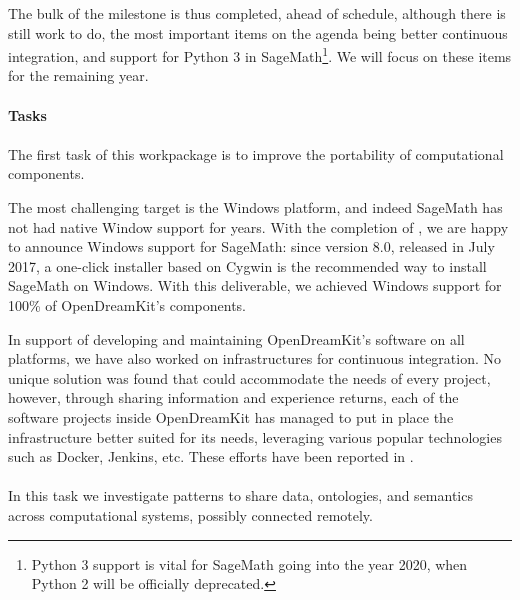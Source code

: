   The bulk of the milestone is thus completed, ahead of schedule,
  although there is still work to do, the most important items on the
  agenda being better continuous integration, and support for Python 3
  in SageMath\footnote{Python 3 support is vital for SageMath going
    into the year 2020, when Python 2 will be officially
    deprecated.}. We will focus on these items for the remaining year.
  
\paragraph{Tasks}

  \paragraph{}
  \label{component-architecture@portability}
  The first task of this workpackage is to improve the portability of
  computational components.

  The most challenging target is the Windows platform, and indeed
  SageMath has not had native Window support for years. With the
  completion of
  , we are
  happy to announce Windows support for SageMath: since version 8.0,
  released in July 2017, a one-click installer based on Cygwin is the
  recommended way to install SageMath on Windows. With this
  deliverable, we achieved Windows support for 100\% of OpenDreamKit's
  components.

  In support of developing and maintaining OpenDreamKit's software on
  all platforms, we have also worked on infrastructures for continuous
  integration. No unique solution was found that could accommodate the
  needs of every project, however, through sharing information and
  experience returns, each of the software projects inside
  OpenDreamKit has managed to put in place the infrastructure better
  suited for its needs, leveraging various popular technologies such
  as Docker, Jenkins, etc. These efforts have been reported in
  .

  \paragraph{}
  \label{component-architecture@interface-systems}
  In this task we investigate patterns to share data, ontologies,
  and semantics across computational systems, possibly connected
  remotely.

